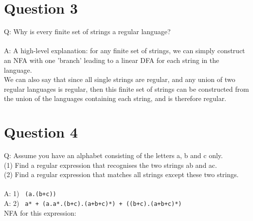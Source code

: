 \documentclass[english]{scrartcl}
\begin{document}
\section*{Question 3}
Q: Why is every finite set of strings a regular language?
\\
\\
A: A high-level explanation: for any finite set of strings, we can simply construct an NFA with one 'branch' leading to a linear DFA for each string in the language. \\
We can also say that since all single strings are regular, and any union of two regular languages is regular, then this finite set of strings can be constructed from the union of the languages containing each string, and is therefore regular.


\section*{Question 4}
Q: Assume you have an alphabet consisting of the letters a, b and c only. \\
(1) Find a regular expression that recognises the two strings ab and ac. \\
(2) Find a regular expression that matches all strings except these two strings.
\\
\\
A: 1) \verb~ (a.(b+c)) ~ \\
A: 2) \verb~ a* + (a.a*.(b+c).(a+b+c)*) + ((b+c).(a+b+c)*)~ \\
\newpage
NFA for this expression:

\end{document}
